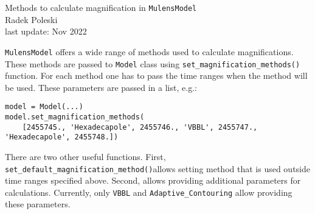 \documentclass[12pt]{article}
\newcommand\MM{{\tt MulensModel}}
\begin{document}

\begin{center}
{\LARGE Methods to calculate magnification in \MM}\\
\bigskip
Radek Poleski\\
last update: Nov 2022
\end{center}

\bigskip\bigskip

{\MM} offers a wide range of methods used to calculate magnifications. 
These methods are passed to {\tt Model} class using 
{\tt set\_magnification\_methods()} function.  For each method one has to 
pass the time ranges when the method will be used.  These parameters are 
passed in a list, e.g.:

\begin{verbatim}
model = Model(...)
model.set_magnification_methods(
    [2455745., 'Hexadecapole', 2455746., 'VBBL', 2455747., 'Hexadecapole', 2455748.])
\end{verbatim}

There are two other useful functions. 
First, {\tt set\_default\_magnification\_method()}\linebreak allows setting method that 
is used outside time ranges specified above.  
Second,  allows 
providing additional parameters for calculations.  Currently, only 
{\tt VBBL} and {\tt Adaptive\_Contouring} allow providing these parameters. 
\end{document}
